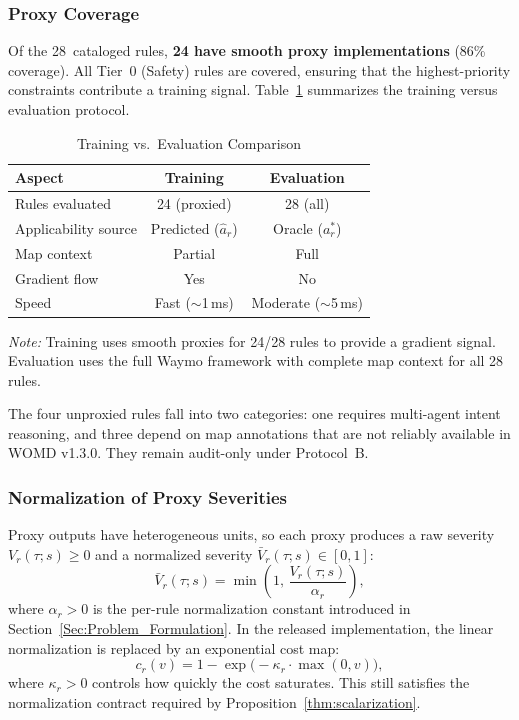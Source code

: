 \subsubsection{Proxy Coverage}

Of the 28~cataloged rules, \textbf{24 have smooth proxy implementations}
(86\% coverage).  All Tier~0 (Safety) rules are covered, ensuring that the highest-priority constraints contribute a training signal. Table~\ref{tab:training_eval_comparison} summarizes the training versus evaluation protocol.

\begin{table}[h]
\centering
\caption{Training vs.\ Evaluation Comparison}
\label{tab:training_eval_comparison}
\begin{tabular}{lcc}
\toprule
\textbf{Aspect} & \textbf{Training} & \textbf{Evaluation} \\
\midrule
Rules evaluated & 24 (proxied) & 28 (all) \\
Applicability source & Predicted ($\hat{a}_r$) & Oracle ($a_r^*$) \\
Map context & Partial & Full \\
Gradient flow & Yes & No \\
Speed & Fast ($\sim$1\,ms) & Moderate ($\sim$5\,ms) \\
\bottomrule
\end{tabular}
\vspace{2mm}
\footnotesize
\textit{Note:} Training uses smooth proxies for 24/28 rules to provide a
gradient signal.  Evaluation uses the full Waymo framework with complete map
context for all 28 rules.
\end{table}

The four unproxied rules fall into two categories: one requires multi-agent intent reasoning, and three depend on map annotations that are not reliably available in WOMD v1.3.0. They remain audit-only under Protocol~B.

\subsubsection{Normalization of Proxy Severities}

Proxy outputs have heterogeneous units, so each proxy produces a raw severity $V_r(\tau;s)\ge 0$ and a normalized severity $\bar{V}_r(\tau;s)\in[0,1]$:
\begin{equation}
\bar{V}_r(\tau;s)=\min\!\left(1,\,\frac{V_r(\tau;s)}{\alpha_r}\right),
\end{equation}
where $\alpha_r{>}0$ is the per-rule normalization constant introduced in Section~\ref{Sec:Problem_Formulation}. In the released implementation, the linear normalization is replaced by an exponential cost map:
\begin{equation}
c_r(v) = 1 - \exp\!\bigl(-\kappa_r \cdot \max(0, v)\bigr),
\label{eq:exponential_cost}
\end{equation}
where $\kappa_r > 0$ controls how quickly the cost saturates. This still satisfies the normalization contract required by Proposition~\ref{thm:scalarization}.

